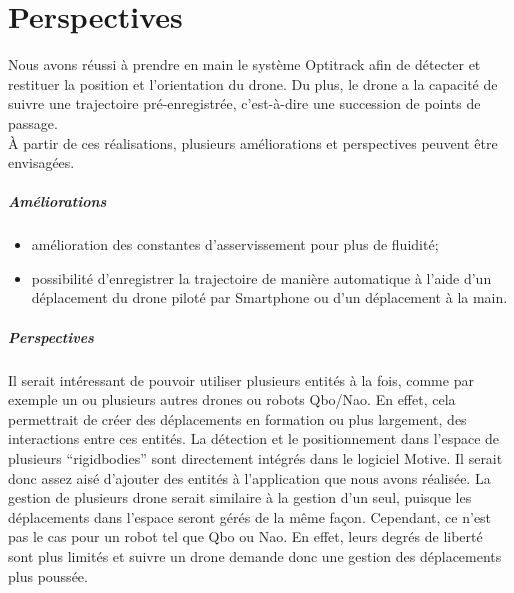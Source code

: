 \chapter{Perspectives}
    Nous avons réussi à prendre en main le système Optitrack afin de détecter et restituer la position et l'orientation du drone. Du plus, le drone a la capacité de suivre une trajectoire pré-enregistrée, c'est-à-dire une succession de points de passage. \\

    À partir de ces réalisations, plusieurs améliorations et perspectives peuvent être envisagées.

    \paragraph{Améliorations}
    \begin{itemize}
        \item amélioration des constantes d'asservissement pour plus de fluidité;
        \item possibilité d'enregistrer la trajectoire de manière automatique à l'aide d'un déplacement du drone piloté par Smartphone ou d'un déplacement à la main.
    \end{itemize}


    \paragraph{Perspectives}
    Il serait intéressant de pouvoir utiliser plusieurs entités à la fois, comme par exemple un ou plusieurs autres drones ou robots Qbo/Nao. En effet, cela permettrait de créer des déplacements en formation ou plus largement, des interactions entre ces entités. La détection et le positionnement dans l'espace de plusieurs ``rigidbodies'' sont directement intégrés dans le logiciel Motive. Il serait donc assez aisé d'ajouter des entités à l'application que nous avons réalisée. La gestion de plusieurs drone serait similaire à la gestion d'un seul, puisque les déplacements dans l'espace seront gérés de la même façon. Cependant, ce n'est pas le cas pour un robot tel que Qbo ou Nao. En effet, leurs degrés de liberté sont plus limités et suivre un drone demande donc une gestion des déplacements plus poussée.
